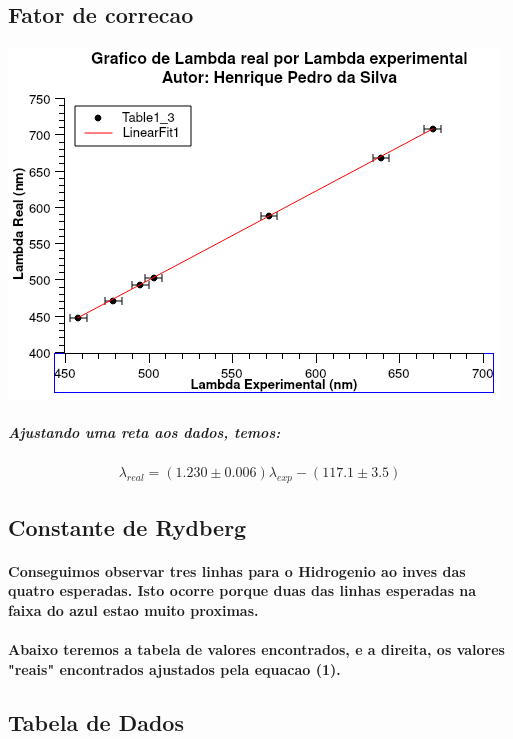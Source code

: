 \documentclass[12pt,twoside, a4paper, twocolumn]{article}
\begin{document}
\subsection{Fator de correcao}
\begin{adjustbox}{scale=0.70}
  \includegraphics{Graph1.png}
\end{adjustbox}

\subparagraph*{Ajustando uma reta aos dados, temos:}

\begin{equation}
  \lambda_{real} = (1.230 \pm 0.006) \lambda_{exp} - (117.1 \pm 3.5)
\end{equation}

\subsection{Constante de Rydberg}

\paragraph*{Conseguimos observar tres linhas para o Hidrogenio ao inves das quatro esperadas. Isto ocorre porque duas das linhas esperadas na faixa do azul estao muito proximas.}

\paragraph*{Abaixo teremos a tabela de valores encontrados, e a direita, os valores "reais" encontrados ajustados pela equacao (1).}

\subsection{Tabela de Dados}
\end{document}
